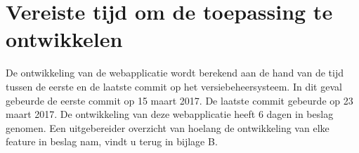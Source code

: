 \section{Vereiste tijd om de toepassing te ontwikkelen}
De ontwikkeling van de webapplicatie wordt berekend aan de hand van de tijd tussen de eerste en de laatste commit op het
versiebeheersysteem. In dit geval gebeurde de eerste commit op 15 maart 2017. De laatste commit gebeurde op 23 maart 2017.
De ontwikkeling van deze webapplicatie heeft 6 dagen in beslag genomen. Een uitgebereider overzicht van hoelang de ontwikkeling
van elke feature in beslag nam, vindt u terug in bijlage B.
